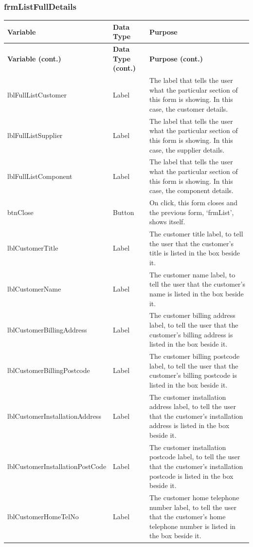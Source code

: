 	\subsubsection{frmListFullDetails}
		\begin{longtable}{ | p{4cm} | p{3cm} | p{10cm} |}
		\hline
		\textbf{Variable} & \textbf{Data Type} & \textbf{Purpose}\\
		\endfirsthead
		\hline
		\textbf{Variable (cont.)} & \textbf{Data Type (cont.)} & \textbf{Purpose (cont.)}\\
		\endhead
		\hline
		lblFullListCustomer & Label & The label that tells the user what the particular section of this form is showing.  In this case, the customer details.\\
		\hline
		lblFullListSupplier & Label & The label that tells the user what the particular section of this form is showing.  In this case, the supplier details.\\
		\hline
		lblFullListComponent & Label & The label that tells the user what the particular section of this form is showing.  In this case, the component details.\\
		\hline
		btnClose & Button & On click, this form closes and the previous form, `frmList', shows itself.\\
		\hline
		lblCustomerTitle & Label & The customer title label, to tell the user that the customer's title is listed in the box beside it.\\
		\hline
		lblCustomerName & Label & The customer name label, to tell the user that the customer's name is listed in the box beside it.\\
		\hline
		lblCustomerBillingAddress & Label & The customer billing address label, to tell the user that the customer's billing address is listed in the box beside it.\\
		\hline
		lblCustomerBillingPostcode & Label & The customer billing postcode label, to tell the user that the customer's billing postcode is listed in the box beside it.\\
		\hline
		lblCustomerInstallationAddress & Label & The customer installation address label, to tell the user that the customer's installation address is listed in the box beside it.\\
		\hline
		lblCustomerInstallationPostCode & Label & The customer installation postcode label, to tell the user that the customer's installation postcode is listed in the box beside it.\\
		\hline
		lblCustomerHomeTelNo & Label & The customer home telephone number label, to tell the user that the customer's home telephone number is listed in the box beside it.\\

\end{longtable}
